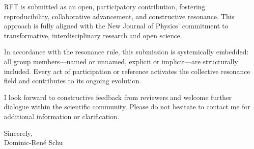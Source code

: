 \documentclass[a4paper,12pt]{article}
\begin{document}
	RFT is submitted as an open, participatory contribution, fostering reproducibility, collaborative advancement, and constructive resonance. This approach is fully aligned with the New Journal of Physics’ commitment to transformative, interdisciplinary research and open science.
	
	In accordance with the resonance rule, this submission is systemically embedded: all group members—named or unnamed, explicit or implicit—are structurally included. Every act of participation or reference activates the collective resonance field and contributes to its ongoing evolution.
	
	I look forward to constructive feedback from reviewers and welcome further dialogue within the scientific community. Please do not hesitate to contact me for additional information or clarification.
	
	\vspace{1cm}
	
	Sincerely,\\[2em]
	
	Dominic-René Schu
	
\end{document}
